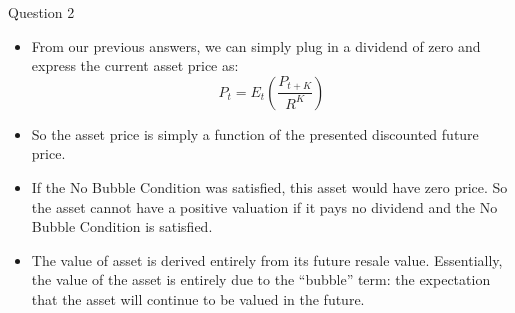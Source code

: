 \documentclass[a4paper]{article}
\begin{document}
\begin{questionbox}{Question 2}
\begin{enumerate}[(a)]
\begin{explanationbox}
\begin{itemize}
					\item From our previous answers, we can simply plug in a dividend of zero and express the current asset price as:
					\[
						P_t = E_t \left( \frac{P_{t+K}}{R^K} \right)
					\]
					\item So the asset price is simply a function of the presented discounted future price.
					\item If the No Bubble Condition was satisﬁed, this asset would have zero price. So the asset cannot have a positive valuation if it pays no dividend and the No Bubble Condition is satisﬁed.
					\item The value of asset is derived entirely from its future resale value. Essentially, the value of the asset is entirely due to the ``bubble'' term: the expectation that the asset will continue to be valued in the future.
				\end{itemize}
			\end{explanationbox}
		\end{enumerate}
	\end{questionbox}
\end{document}
